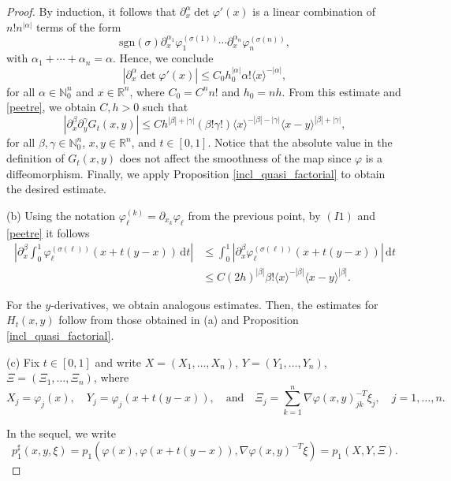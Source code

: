 \documentclass[10pt,a4paper]{amsart}
\begin{document}
\begin{proof}
	By induction, it follows that $\partial_x^\alpha\det\varphi'(x)$ is a linear combination of $n!n^{|\alpha|}$ terms of the form
	\[\mathrm{sgn}(\sigma)\partial_x^{\alpha_1}\varphi_1^{(\sigma(1))}\cdots \partial_x^{\alpha_n}\varphi_n^{(\sigma(n))},\]
	with $\alpha_1+\cdots+\alpha_n=\alpha$. Hence, we conclude
	\[|\partial_x^\alpha\det\varphi'(x)|\leq C_0h_0^{|\alpha|}\alpha!\langle x\rangle^{-|\alpha|},\]
	for all $\alpha\in\mathbb{N}_0^n$ and $x\in\mathbb{R}^n$, where $C_0=C^nn!$ and $h_0=nh$.
	From this estimate and \eqref{peetre}, we obtain $C,h>0$ such that
	\[|\partial_x^\beta\partial_y^\gamma G_t(x,y)|\leq Ch^{|\beta|+|\gamma|}(\beta!\gamma!)\langle x\rangle^{-|\beta|-|\gamma|}\langle x-y\rangle^{|\beta|+|\gamma|},\]
	for all $\beta,\gamma\in\mathbb{N}_0^n$, $x,y\in\mathbb{R}^n$, and $t\in [0,1]$. Notice that the absolute value in the definition of $G_t(x,y)$ does not affect the smoothness of the map since $\varphi$ is a diffeomorphism. Finally, we apply Proposition \ref{incl_quasi_factorial} to obtain the desired estimate.
	
	\medskip\noindent
	(b) Using the notation $\varphi_{\ell}^{(k)}=\partial_{x_k}\varphi_\ell$ from the previous point, by $(I1)$ and \eqref{peetre} it follows
	\begin{align*}
		\left|\partial_x^\beta\int_0^1\varphi_{\ell}^{(\sigma(\ell))}(x+t(y-x))\,\mathrm{d}t\right| & 
		\leq \int_0^1\left|\partial_x^\beta \varphi_{\ell}^{(\sigma(\ell))}(x+t(y-x))\right|\,\mathrm{d}t \\
		& \leq C(2h)^{|\beta|}\beta!\langle x\rangle^{-|\beta|}\langle x-y\rangle^{|\beta|}.
	\end{align*}
	
	For the $y$-derivatives, we obtain analogous estimates. Then, the estimates for $H_t(x,y)$ follow from those obtained in (a) 
	and Proposition \ref{incl_quasi_factorial}.
	
	\medskip\noindent
	(c) Fix $t\in [0,1]$ and write $X=(X_1,\dots,X_n)$, $Y=(Y_1,\dots,Y_n)$, $\Xi=(\Xi_1,\dots,\Xi_n)$, where
	\[X_j=\varphi_j(x),\quad Y_j=\varphi_j(x+t(y-x)),\quad\text{and}\quad \Xi_j=\sum_{k=1}^n \nabla\varphi(x,y)_{jk}^{-T}\xi_j,\quad j=1,\dots,n.\]
	
	In the sequel, we write
	\[
		p_1^\sharp(x,y,\xi)=p_1(\varphi(x),\varphi(x+t(y-x)),\nabla\varphi(x,y)^{-T}\xi)=p_1(X,Y,\Xi).
	\]
	

\end{proof}
\end{document}

